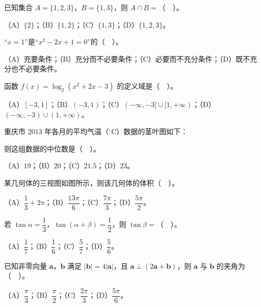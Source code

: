 \begin{question}
已知集合 $A=\{1,2,3\}$，$B=\{1,3\}$，则 $A\cap B=$（　）。

（A）$\{2\}$；（B）$\{1,2\}$；（C）$\{1,3\}$；（D）$\{1,2,3\}$。

\end{question}
\begin{question}
“$x=1$”是“$x^{2}-2x+1=0$”的（　）。

（A）充要条件；（B）充分而不必要条件；（C）必要而不充分条件；（D）既不充分也不必要条件。

\end{question}
\begin{question}
函数 $f(x)=\log_{2}(x^{2}+2x-3)$ 的定义域是（　）。

（A）$[-3,1]$；（B）$(-3,1)$；（C）$(-\infty,-3]\cup[1,+\infty)$；（D）$(-\infty,-3)\cup(1,+\infty)$。

\Needspace{0.4\textheight}
\end{question}
\begin{question}
重庆市 $2013$ 年各月的平均气温（$^\circ$C）数据的茎叶图如下：
\nopagebreak[4]
\begin{center}\end{center}
\nopagebreak[4]
则这组数据的中位数是（　）。

（A）$19$；（B）$20$；（C）$21.5$；（D）$23$。

\Needspace{0.4\textheight}
\end{question}
\begin{question}
某几何体的三视图如图所示，则该几何体的体积（　）。
\nopagebreak[4]
\begin{center}\end{center}
\nopagebreak[4]
（A）$\dfrac{1}{3}+2\pi$；（B）$\dfrac{13\pi}{6}$；（C）$\dfrac{7\pi}{3}$；（D）$\dfrac{5\pi}{2}$。

\end{question}
\begin{question}
若 $\tan\alpha=\dfrac{1}{3}$，$\tan(\alpha+\beta)=\dfrac{1}{2}$，则 $\tan\beta=$（　）。

（A）$\dfrac{1}{7}$；（B）$\dfrac{1}{6}$；（C）$\dfrac{5}{7}$；（D）$\dfrac{5}{6}$。

\end{question}
\begin{question}
已知非零向量 $\boldsymbol{a}$，$\boldsymbol{b}$ 满足 $|\boldsymbol{b}|=4|\boldsymbol{a}|$，且 $\boldsymbol{a}\perp(2\boldsymbol{a}+\boldsymbol{b})$，则 $\boldsymbol{a}$ 与 $\boldsymbol{b}$ 的夹角为（　）。

（A）$\dfrac{\pi}{3}$；（B）$\dfrac{\pi}{2}$；（C）$\dfrac{2\pi}{3}$；（D）$\dfrac{5\pi}{6}$。

\Needspace{0.4\textheight}
\end{question}
